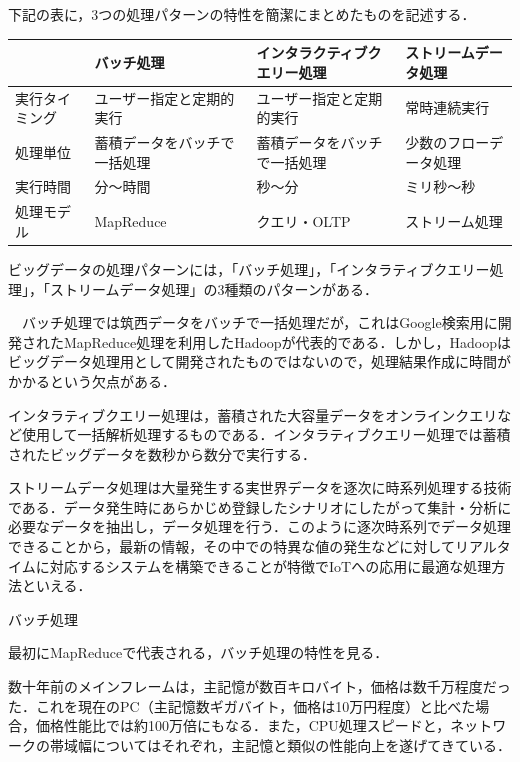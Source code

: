 下記の表に，3つの処理パターンの特性を簡潔にまとめたものを記述する．

\begin{table}[H]
  \begin{tabular}{|l|l|l|l|} \hline
                     & バッチ処理 & インタラクティブクエリー処理 & ストリームデータ処理 \\ \hline
    実行タイミング & ユーザー指定と定期的実行 & ユーザー指定と定期的実行 & 常時連続実行 \\ \hline
    処理単位 & 蓄積データをバッチで一括処理 & 蓄積データをバッチで一括処理 & 少数のフローデータ処理 \\ \hline
    実行時間 & 分～時間 & 秒～分 & ミリ秒～秒 \\ \hline
    処理モデル & MapReduce & クエリ・OLTP & ストリーム処理 \\ \hline
  \end{tabular}
\end{table}


ビッグデータの処理パターンには，「バッチ処理」，「インタラティブクエリー処理」，「ストリームデータ処理」の3種類のパターンがある．

　バッチ処理では筑西データをバッチで一括処理だが，これはGoogle検索用に開発されたMapReduce処理を利用したHadoopが代表的である．しかし，Hadoopはビッグデータ処理用として開発されたものではないので，処理結果作成に時間がかかるという欠点がある．

インタラティブクエリー処理は，蓄積された大容量データをオンラインクエリなど使用して一括解析処理するものである．インタラティブクエリー処理では蓄積されたビッグデータを数秒から数分で実行する．

ストリームデータ処理は大量発生する実世界データを逐次に時系列処理する技術である．データ発生時にあらかじめ登録したシナリオにしたがって集計・分析に必要なデータを抽出し，データ処理を行う．このように逐次時系列でデータ処理できることから，最新の情報，その中での特異な値の発生などに対してリアルタイムに対応するシステムを構築できることが特徴でIoTへの応用に最適な処理方法といえる．\cite{bigquerystart}


バッチ処理

最初にMapReduceで代表される，バッチ処理の特性を見る．

数十年前のメインフレームは，主記憶が数百キロバイト，価格は数千万程度だった．これを現在のPC（主記憶数ギガバイト，価格は10万円程度）と比べた場合，価格性能比では約100万倍にもなる．また，CPU処理スピードと，ネットワークの帯域幅についてはそれぞれ，主記憶と類似の性能向上を遂げてきている．

